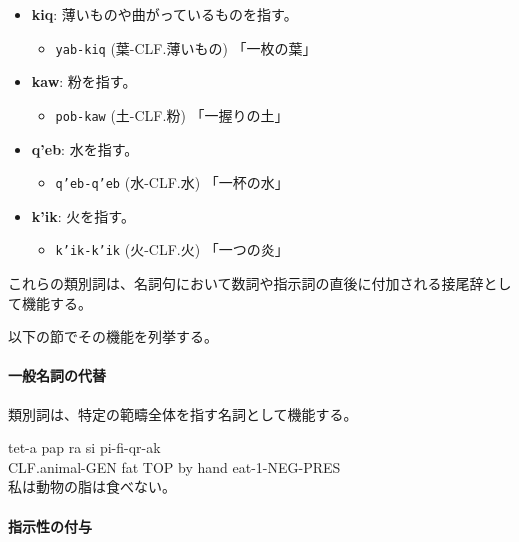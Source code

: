 \begin{itemize}
\begin{itemize}
\begin{itemize}
                \end{itemize}
            \item \textbf{kiq}: 薄いものや曲がっているものを指す。
                \begin{itemize}
                    \item \texttt{yab-kiq} (葉-CLF.薄いもの) %
                    \quad 「一枚の葉」
                \end{itemize}
            \item \textbf{kaw}: 粉を指す。
                \begin{itemize}
                    \item \texttt{pob-kaw} (土-CLF.粉) %
                    \quad 「一握りの土」
                \end{itemize}
            \item \textbf{q'eb}: 水を指す。%
                \begin{itemize}
                    \item \texttt{q'eb-q'eb} (水-CLF.水)
                    \quad 「一杯の水」
                \end{itemize}
            \item \textbf{k'ik}: 火を指す。%
                \begin{itemize}
                    \item \texttt{k'ik-k'ik} (火-CLF.火)
                    \quad 「一つの炎」
                \end{itemize}
        \end{itemize}
\end{itemize}
これらの類別詞は、名詞句において数詞や指示詞の直後に付加される接尾辞として機能する。

以下の節でその機能を列挙する。

\paragraph{一般名詞の代替}
類別詞は、特定の範疇全体を指す名詞として機能する。
\begin{exe}
\ex \gll tet-a pap ra si pi-fi-qr-ak\\
        CLF.animal-GEN fat TOP by hand eat-1-NEG-PRES\\
\glt 私は動物の脂は食べない。
\end{exe}

\paragraph{指示性の付与}

